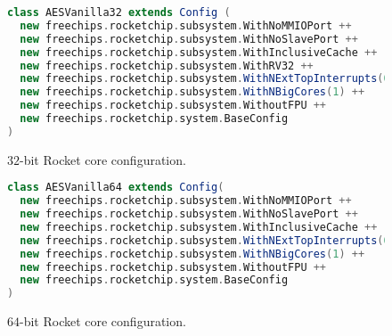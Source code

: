 
\begin{figure}[!h]
\begin{lstlisting}[language=scala]
class AESVanilla32 extends Config (
  new freechips.rocketchip.subsystem.WithNoMMIOPort ++
  new freechips.rocketchip.subsystem.WithNoSlavePort ++
  new freechips.rocketchip.subsystem.WithInclusiveCache ++
  new freechips.rocketchip.subsystem.WithRV32 ++
  new freechips.rocketchip.subsystem.WithNExtTopInterrupts(0) ++
  new freechips.rocketchip.subsystem.WithNBigCores(1) ++
  new freechips.rocketchip.subsystem.WithoutFPU ++
  new freechips.rocketchip.system.BaseConfig
)
\end{lstlisting}
\caption{$32$-bit Rocket core configuration.}
\label{fig:rocket:32}
\end{figure}

\begin{figure}[!h]
\begin{lstlisting}[language=scala]
class AESVanilla64 extends Config(
  new freechips.rocketchip.subsystem.WithNoMMIOPort ++
  new freechips.rocketchip.subsystem.WithNoSlavePort ++
  new freechips.rocketchip.subsystem.WithInclusiveCache ++
  new freechips.rocketchip.subsystem.WithNExtTopInterrupts(0) ++
  new freechips.rocketchip.subsystem.WithNBigCores(1) ++
  new freechips.rocketchip.subsystem.WithoutFPU ++
  new freechips.rocketchip.system.BaseConfig
)
\end{lstlisting}
\caption{$64$-bit Rocket core configuration.}
\label{fig:rocket:64}
\end{figure}


